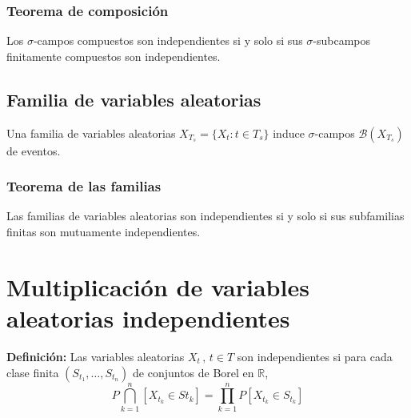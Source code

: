 \subsubsection{Teorema de composición}
\begin{theorem}
Los $\sigma$-campos compuestos son independientes si y solo si sus $\sigma$-subcampos finitamente compuestos son independientes.
\end{theorem}
\subsection{Familia de variables aleatorias}
Una familia de variables aleatorias $X_{T_s}=\{ X_t : t\in T_s \}$ induce $\sigma$-campos $\mathcal{B}(X_{T_s})$ de eventos.
\subsubsection{Teorema de las familias}
\begin{theorem}
Las familias de variables aleatorias son independientes si y solo si sus subfamilias finitas son mutuamente independientes.
\end{theorem}
\section{Multiplicación de variables aleatorias independientes}
\textbf{Definición: } Las variables aleatorias $X_t\, , \, t\in T$ son independientes si para cada clase finita $(S_{t_1},\ldots , S_{t_n})$ de conjuntos de Borel en $\mathbb{R}$,
$$P\bigcap_{k=1}^{n}[X_{t_k}\in S{t_k}]=\displaystyle\prod_{k=1}^n P[X_{t_k}\in S_{t_k}]$$

